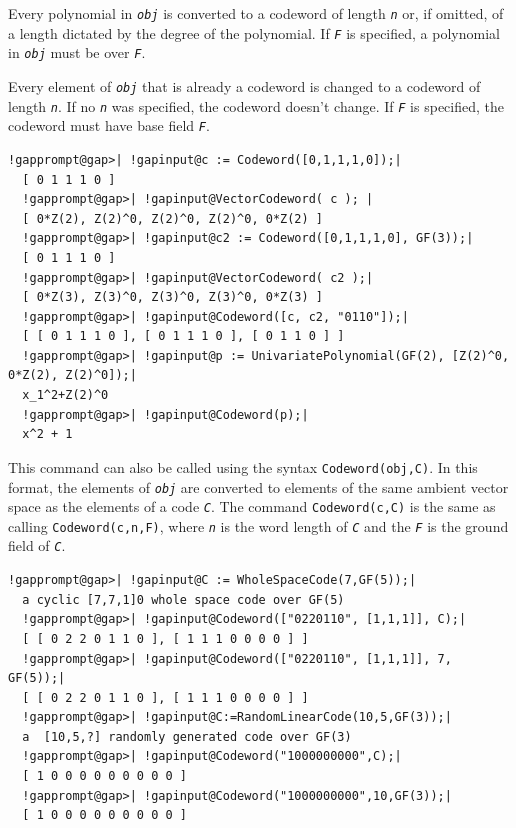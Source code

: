 \documentclass[a4paper,11pt]{report}
\begin{document}
{{{ Every polynomial in \mbox{\texttt{\mdseries\slshape obj}} is converted to a codeword of length \mbox{\texttt{\mdseries\slshape n}} or, if omitted, of a length dictated by the degree of the polynomial. If \mbox{\texttt{\mdseries\slshape F}} is specified, a polynomial in \mbox{\texttt{\mdseries\slshape obj}} must be over \mbox{\texttt{\mdseries\slshape F}}. 

 Every element of \mbox{\texttt{\mdseries\slshape obj}} that is already a codeword is changed to a codeword of length \mbox{\texttt{\mdseries\slshape n}}. If no \mbox{\texttt{\mdseries\slshape n}} was specified, the codeword doesn't change. If \mbox{\texttt{\mdseries\slshape F}} is specified, the codeword must have base field \mbox{\texttt{\mdseries\slshape F}}. 
\begin{Verbatim}[commandchars=!@|,fontsize=\small,frame=single,label=Example]
  !gapprompt@gap>| !gapinput@c := Codeword([0,1,1,1,0]);|
  [ 0 1 1 1 0 ]
  !gapprompt@gap>| !gapinput@VectorCodeword( c ); |
  [ 0*Z(2), Z(2)^0, Z(2)^0, Z(2)^0, 0*Z(2) ]
  !gapprompt@gap>| !gapinput@c2 := Codeword([0,1,1,1,0], GF(3));|
  [ 0 1 1 1 0 ]
  !gapprompt@gap>| !gapinput@VectorCodeword( c2 );|
  [ 0*Z(3), Z(3)^0, Z(3)^0, Z(3)^0, 0*Z(3) ]
  !gapprompt@gap>| !gapinput@Codeword([c, c2, "0110"]);|
  [ [ 0 1 1 1 0 ], [ 0 1 1 1 0 ], [ 0 1 1 0 ] ]
  !gapprompt@gap>| !gapinput@p := UnivariatePolynomial(GF(2), [Z(2)^0, 0*Z(2), Z(2)^0]);|
  x_1^2+Z(2)^0
  !gapprompt@gap>| !gapinput@Codeword(p);|
  x^2 + 1
\end{Verbatim}
  

 This command can also be called using the syntax \texttt{Codeword(obj,C)}. In this format, the elements of \mbox{\texttt{\mdseries\slshape obj}} are converted to elements of the same ambient vector space as the elements of
a code \mbox{\texttt{\mdseries\slshape C}}. The command \texttt{Codeword(c,C)} is the same as calling \texttt{Codeword(c,n,F)}, where \mbox{\texttt{\mdseries\slshape n}} is the word length of \mbox{\texttt{\mdseries\slshape C}} and the \mbox{\texttt{\mdseries\slshape F}} is the ground field of \mbox{\texttt{\mdseries\slshape C}}. }

 
\begin{Verbatim}[commandchars=!@|,fontsize=\small,frame=single,label=Example]
  !gapprompt@gap>| !gapinput@C := WholeSpaceCode(7,GF(5));|
  a cyclic [7,7,1]0 whole space code over GF(5)
  !gapprompt@gap>| !gapinput@Codeword(["0220110", [1,1,1]], C);|
  [ [ 0 2 2 0 1 1 0 ], [ 1 1 1 0 0 0 0 ] ]
  !gapprompt@gap>| !gapinput@Codeword(["0220110", [1,1,1]], 7, GF(5));|
  [ [ 0 2 2 0 1 1 0 ], [ 1 1 1 0 0 0 0 ] ]
  !gapprompt@gap>| !gapinput@C:=RandomLinearCode(10,5,GF(3));|
  a  [10,5,?] randomly generated code over GF(3)
  !gapprompt@gap>| !gapinput@Codeword("1000000000",C);|
  [ 1 0 0 0 0 0 0 0 0 0 ]
  !gapprompt@gap>| !gapinput@Codeword("1000000000",10,GF(3));|
  [ 1 0 0 0 0 0 0 0 0 0 ]
\end{Verbatim}
  

}}
\end{document}
